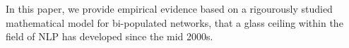 In this paper, we provide empirical evidence based on a rigourously studied mathematical model for bi-populated networks, that a glass ceiling within the field of NLP has developed since the mid 2000s.
